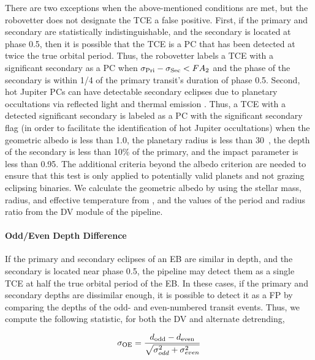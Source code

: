 There are two exceptions when the above-mentioned conditions are met, but the robovetter does not designate the TCE a false positive. First, if the primary and secondary are statistically indistinguishable, and the secondary is located at phase 0.5, then it is possible that the TCE is a PC that has been detected at twice the true orbital period. Thus, the robovetter labels a TCE with a significant secondary as a PC when ${\sigma_{\rm Pri} - \sigma_{\rm Sec} < FA_{2}}$ and the phase of the secondary is within 1/4 of the primary transit's duration of phase 0.5. Second, hot Jupiter PCs can have detectable secondary eclipses due to planetary occultations via reflected light and thermal emission \citep{Coughlin2012}. Thus, a TCE with a detected significant secondary is labeled as a PC with the significant secondary flag (in order to facilitate the identification of hot Jupiter occultations) when the geometric albedo is less than 1.0, the planetary radius is less than 30~\re{}, the depth of the secondary is less than 10\% of the primary, and the impact parameter is less than 0.95. The additional criteria beyond the albedo criterion are needed to ensure that this test is only applied to potentially valid planets and not grazing eclipsing binaries. We calculate the geometric albedo by using the stellar mass, radius, and effective temperature from \citet{Huber2014a}, and the values of the period and radius ratio from the DV module of the \kepler{} pipeline.



\paragraph{Odd/Even Depth Difference}

If the primary and secondary eclipses of an EB are similar in depth, and the secondary is located near phase 0.5, the \kepler{} pipeline may detect them as a single TCE at half the true orbital period of the EB. In these cases, if the primary and secondary depths are dissimilar enough, it is possible to detect it as a FP by comparing the depths of the odd- and even-numbered transit events. Thus, we compute the following statistic, for both the DV and alternate detrending,

\begin{equation}
\sigma_{\rm OE} = \frac{d_{\rm odd} - d_{\rm even}}{\sqrt{\sigma_{odd}^{2} + \sigma_{even}^{2}}} 
\end{equation}


